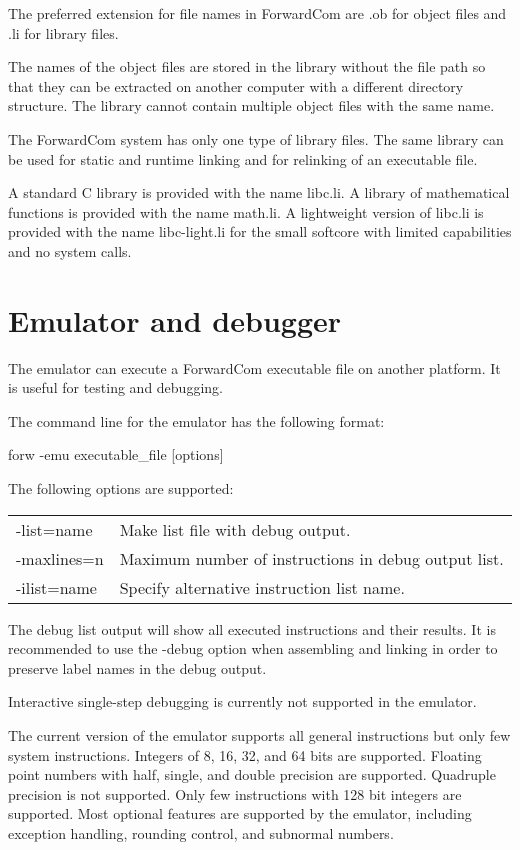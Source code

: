 \documentclass[forwardcom.tex]{subfiles}
\begin{document}
The preferred extension for file names in ForwardCom are .ob for object files and .li for library files.
\vv

The names of the object files are stored in the library without the file path so that they can be extracted on another computer with a different directory structure. The library cannot contain multiple object files with the same name.
\vv

The ForwardCom system has only one type of library files. The same library can be used for static and runtime linking and for relinking of an executable file.
\vv

A standard C library is provided with the name libc.li. 
A library of mathematical functions is provided with the name math.li. 
A lightweight version of libc.li is provided with the name libc-light.li for the small softcore with limited capabilities and no system calls.
\vv

\section{Emulator and debugger} \label{emulator}

The emulator can execute a ForwardCom executable file on another platform. It is useful for testing and debugging.
\vv

The command line for the emulator has the following format:
\vv

\hspace{5mm} {\ttfamily forw -emu executable\_file [options]}
\vv

\vv
The following options are supported:\\
\begin{tabular}{|p{22mm}p{140mm}|}
\hline
-list=name & Make list file with debug output.\\
-maxlines=n & Maximum number of instructions in debug output list.\\
-ilist=name & Specify alternative instruction list name.\\
\hline
\end{tabular}
\vv

The debug list output will show all executed instructions and their results. 
It is recommended to use the -debug option when assembling and linking in order to preserve label names in the debug output.
\vv

Interactive single-step debugging is currently not supported in the emulator.
\vv

The current version of the emulator supports all general instructions but only few system instructions. Integers of 8, 16, 32, and 64 bits are supported. Floating point numbers with half, single, and double precision are supported. Quadruple precision is not supported. Only few instructions with 128 bit integers are supported. 
Most optional features are supported by the emulator, including exception handling, rounding control, and subnormal numbers.
\vv
\end{document}
